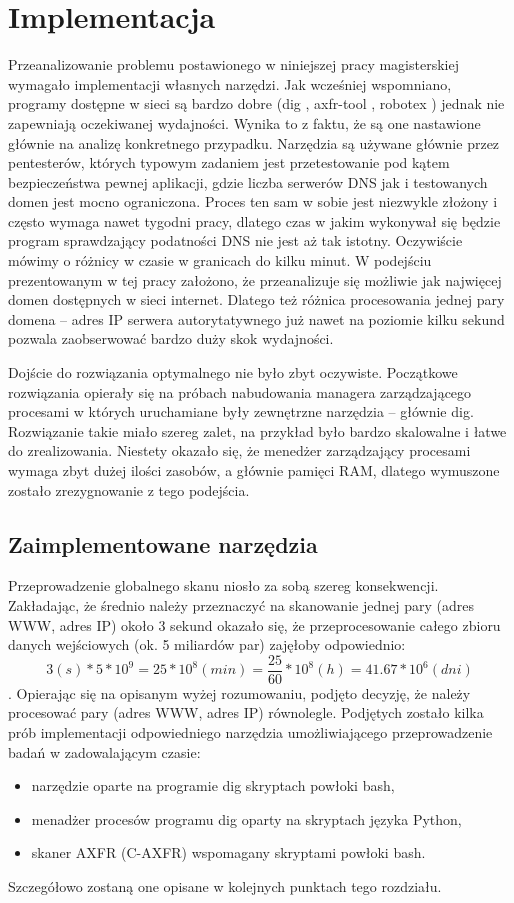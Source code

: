 \chapter{Implementacja}
Przeanalizowanie problemu postawionego w niniejszej pracy magisterskiej wymagało implementacji własnych narzędzi. Jak wcześniej
wspomniano, programy dostępne w sieci są bardzo dobre (dig \cite{dig}, axfr-tool \cite{python_axfr_test}, robotex \cite{robotex})
jednak nie zapewniają oczekiwanej wydajności. Wynika to z faktu, że są one nastawione głównie na analizę konkretnego przypadku.
Narzędzia są używane głównie przez pentesterów, których typowym zadaniem jest przetestowanie pod kątem bezpieczeństwa pewnej
aplikacji, gdzie liczba serwerów DNS jak i testowanych domen jest mocno ograniczona. Proces ten sam w sobie jest niezwykle złożony
i często wymaga nawet tygodni pracy, dlatego czas w jakim wykonywał się będzie program sprawdzający podatności DNS nie jest aż tak
istotny. Oczywiście mówimy o różnicy w czasie w granicach do kilku minut. W podejściu prezentowanym w tej pracy założono, że
przeanalizuje się możliwie jak najwięcej domen dostępnych w sieci internet. Dlatego też różnica procesowania jednej pary
domena -- adres IP serwera autorytatywnego już nawet na poziomie kilku sekund pozwala zaobserwować bardzo duży skok wydajności.

Dojście do rozwiązania optymalnego nie było zbyt oczywiste. Początkowe rozwiązania opierały się na próbach nabudowania managera
zarządzającego procesami w których uruchamiane były zewnętrzne narzędzia -- głównie dig. Rozwiązanie takie miało szereg zalet,
na przykład było bardzo skalowalne i łatwe do zrealizowania. Niestety okazało się, że menedżer zarządzający procesami wymaga
zbyt dużej ilości zasobów, a głównie pamięci RAM, dlatego wymuszone zostało zrezygnowanie z tego podejścia.

\section{Zaimplementowane narzędzia}
Przeprowadzenie globalnego skanu niosło za sobą szereg konsekwencji. Zakładając, że średnio należy przeznaczyć na skanowanie
jednej pary (adres WWW, adres IP) około 3 sekund okazało się, że przeprocesowanie całego zbioru danych wejściowych (ok. 5 miliardów
par) zajęłoby odpowiednio:
$$3(s) * 5 * 10^{9} = 25 * 10^{8}(min) = \frac{25}{60} * 10^{8}(h) = 41.67 * 10^{6} (dni)\label{obliczenia}$$.
Opierając się na opisanym wyżej rozumowaniu, podjęto decyzję, że należy procesować pary (adres WWW, adres IP) równolegle.
Podjętych zostało kilka prób implementacji odpowiedniego narzędzia umożliwiającego przeprowadzenie badań w zadowalającym czasie:
\begin{itemize}
	\item narzędzie oparte na programie dig skryptach powłoki bash,
	\item menadżer procesów programu dig oparty na skryptach języka Python,
	\item skaner AXFR (C-AXFR) wspomagany skryptami powłoki bash.
\end{itemize}
Szczegółowo zostaną one opisane w kolejnych punktach tego rozdziału.

